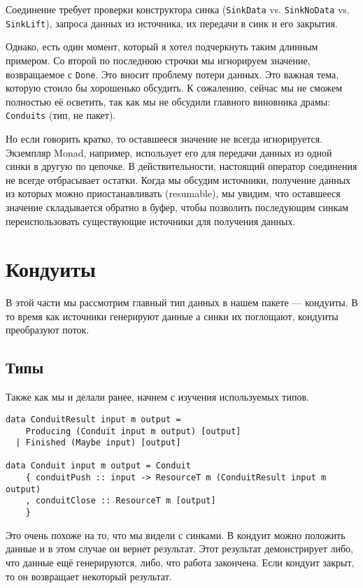 Соединение требует проверки конструктора синка (\lstinline'SinkData' vs. 
\lstinline'SinkNoData' vs. \lstinline'SinkLift'), запроса данных из источника, их передачи
в синк и его закрытия.

Однако, есть один момент, который я хотел подчеркнуть таким длинным примером. Со второй
по последнюю строчки мы игнорируем значение, возвращаемое с \lstinline'Done'. Это вносит
проблему
потери данных. Это важная тема, которую стоило бы хорошенько обсудить. К сожалению,
сейчас мы не сможем полностью её осветить, так как мы не обсудили главного виновника
драмы: \lstinline'Conduits' (тип, не пакет). 

Но если говорить кратко, то оставшееся значение не всегда игнорируется. Экземпляр Monad,
например, использует его для передачи данных из одной синки в другую по цепочке.
В действительности, настоящий оператор соединения не всегде отбрасывает остатки. Когда мы
обсудим источники, получение данных из которых можно приостанавливать (resumable), мы
увидим, что оставшееся значение складывается обратно в буфер, чтобы позволить последующим
синкам переиспользовать существующие источники для получения данных.

\section{Кондуиты}
В этой части мы рассмотрим главный тип данных в нашем пакете --- кондуиты. В то время как
источники генерируют данные а синки их поглощают, кондуиты преобразуют поток.

\subsection{Типы}
Также как мы и делали ранее, начнем с изучения используемых типов.
\begin{lstlisting}
data ConduitResult input m output =
    Producing (Conduit input m output) [output]
  | Finished (Maybe input) [output]

data Conduit input m output = Conduit
    { conduitPush :: input -> ResourceT m (ConduitResult input m output)
    , conduitClose :: ResourceT m [output]
    }
\end{lstlisting}
Это очень похоже на то, что мы видели с синками. В кондуит можно положить данные и в этом
случае он вернет результат. Этот результат демонстрирует либо, что данные ещё
генерируются, либо, что работа закончена. Если кондуит закрыт, то он возвращает некоторый
результат.

